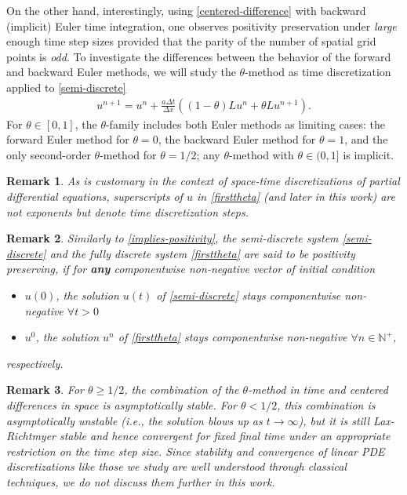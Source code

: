 \documentclass[a4paper]{article}
\newtheorem{remark}{Remark}
\newcommand{\dt}{\Delta t}
\newcommand{\dx}{\Delta x}
\newcommand{\te}{\theta}
\begin{document}
On the other hand, interestingly, using \eqref{centered-difference} with backward (implicit) 
Euler time integration, one 
observes positivity preservation
under \emph{large} enough time step sizes provided that the parity of the number of spatial grid points is \emph{odd}.  To investigate the differences between the behavior
of the forward and backward Euler methods, we will study the $\theta$-method 
\cite[Chapter IV.3]{hairerwanner} as time discretization applied to \eqref{semi-discrete}
\begin{align}\label{firsttheta}
    u^{n+1} = u^n + \frac{a\dt}{\dx}((1-\theta)Lu^n + \theta Lu^{n+1}).
\end{align}
For $\te\in[0,1]$, the $\theta$-family includes both Euler methods as limiting cases: the forward Euler method for $\te=0$, the backward 
 Euler method for $\te=1$, and the only second-order $\te$-method for $\te=1/2$; 
 any $\theta$-method with $\theta\in(0,1]$ is implicit.
 \begin{remark}
As is customary in the context of space-time discretizations of partial differential equations, superscripts of $u$ in \eqref{firsttheta} (and later in this work) are not exponents but denote time discretization steps.
\end{remark}
\begin{remark}
Similarly to \eqref{implies-positivity}, the semi-discrete system \eqref{semi-discrete} and the fully discrete system \eqref{firsttheta} are said to be \emph{positivity preserving}, if for \textbf{any} componentwise non-negative vector of initial condition 
\begin{itemize}
\item $u(0)$, the solution $u(t)$ of \eqref{semi-discrete} stays componentwise non-negative $\forall t>0$
\item $u^0$, the solution $u^n$ of \eqref{firsttheta} stays componentwise non-negative $\forall n\in\mathbb{N}^+$,
\end{itemize}
respectively.
\end{remark}
\begin{remark}
For $\theta\ge1/2$, the combination of the $\theta$-method in time and
centered differences in space is asymptotically stable.  For $\theta<1/2$,
this combination is asymptotically unstable (i.e., the solution blows up
as $t\to\infty$), but it is still Lax-Richtmyer stable and hence convergent
for fixed final time under an appropriate restriction on the time step size.
Since stability and convergence of linear PDE discretizations like those
we study are well understood through classical techniques, we do not discuss
them further in this work.
\end{remark}
\end{document}
